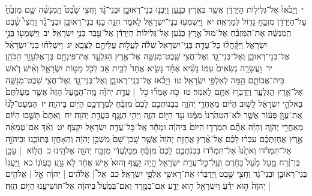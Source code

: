\documentclass[18pt]{article}
\newcommand{\vart}[1]{\Bfootnote{#1}}	%
\begin{document}
 {\loc י~}וַיָּבֹ֙אוּ֙ אֶל־גְּלִיל֣וֹת הַיַּרְדֵּ֔ן אֲשֶׁ֖ר בְּאֶ֣רֶץ כְּנָ֑עַן וַיִּבְנ֣וּ בְנֵי־רְאוּבֵ֣ן וּבְנֵי־גָ֡ד וַחֲצִ֣י שֵׁ֩בֶט֩ הַֽמְנַשֶּׁ֨ה שָׁ֤ם מִזְבֵּ֙חַ֙ עַל־הַיַּרְדֵּ֔ן מִזְבֵּ֥חַ גָּד֖וֹל לְמַרְאֶֽה׃ \startlock
 {\loc יא~}וַיִּשְׁמְע֥וּ בְנֵי־יִשְׂרָאֵ֖ל לֵאמֹ֑ר הִנֵּ֣ה בָנ֣וּ בְנֵי־רְאוּבֵ֣ן וּבְנֵי־גָ֡ד וַחֲצִי֩ שֵׁ֨בֶט הַֽמְנַשֶּׁ֜ה אֶת־הַמִּזְבֵּ֗חַ אֶל־מוּל֙ אֶ֣רֶץ כְּנַ֔עַן אֶל־גְּלִילוֹת֙ הַיַּרְדֵּ֔ן אֶל־עֵ֖בֶר בְּנֵ֥י יִשְׂרָאֵֽל׃ \startlock
 {\loc יב~}וַֽיִּשְׁמְע֖וּ בְּנֵ֣י יִשְׂרָאֵ֑ל וַיִּקָּ֨הֲל֜וּ כׇּל־עֲדַ֤ת בְּנֵֽי־יִשְׂרָאֵל֙ שִׁלֹ֔ה לַעֲל֥וֹת עֲלֵיהֶ֖ם לַצָּבָֽא׃ \startlock
 {\loc יג~}וַיִּשְׁלְח֨וּ בְנֵי־יִשְׂרָאֵ֜ל אֶל־בְּנֵי־רְאוּבֵ֧ן וְאֶל־בְּנֵי־גָ֛ד וְאֶל־חֲצִ֥י שֵֽׁבֶט־מְנַשֶּׁ֖ה אֶל־אֶ֣רֶץ הַגִּלְעָ֑ד אֶת־פִּֽינְחָ֖ס בֶּן־אֶלְעָזָ֥ר הַכֹּהֵֽן׃ \startlock
 {\loc יד~}וַעֲשָׂרָ֤ה נְשִׂאִים֙ עִמּ֔וֹ נָשִׂ֨יא אֶחָ֜ד נָשִׂ֤יא אֶחָד֙ לְבֵ֣ית אָ֔ב לְכֹ֖ל מַטּ֣וֹת יִשְׂרָאֵ֑ל וְאִ֨ישׁ רֹ֧אשׁ בֵּית־אֲבוֹתָ֛ם הֵ֖מָּה לְאַלְפֵ֥י יִשְׂרָאֵֽל׃ \startlock
 {\loc טו~}וַיָּבֹ֜אוּ אֶל־בְּנֵֽי־רְאוּבֵ֧ן וְאֶל־בְּנֵי־גָ֛ד וְאֶל־חֲצִ֥י שֵׁבֶט־מְנַשֶּׁ֖ה אֶל־אֶ֣רֶץ הַגִּלְעָ֑ד וַיְדַבְּר֥וּ אִתָּ֖ם לֵאמֹֽר׃ \startlock
 {\loc טז~}כֹּ֣ה אָמְר֞וּ כֹּ֣ל  |  עֲדַ֣ת יְהֹוָ֗ה מָֽה־הַמַּ֤עַל הַזֶּה֙ אֲשֶׁ֤ר מְעַלְתֶּם֙ בֵּאלֹהֵ֣י יִשְׂרָאֵ֔ל לָשׁ֣וּב הַיּ֔וֹם מֵאַחֲרֵ֖י יְהֹוָ֑ה בִּבְנוֹתְכֶ֤ם לָכֶם֙ מִזְבֵּ֔חַ לִמְרׇדְכֶ֥ם הַיּ֖וֹם בַּיהֹוָֽה׃ \startlock
 {\loc יז~}הַמְעַט־לָ֙נוּ֙ אֶת־עֲוֺ֣ן פְּע֔וֹר אֲשֶׁ֤ר לֹא־הִטַּהַ֙רְנוּ֙ מִמֶּ֔נּוּ עַ֖ד הַיּ֣וֹם הַזֶּ֑ה וַיְהִ֥י הַנֶּ֖גֶף בַּעֲדַ֥ת יְהֹוָֽה׃ \startlock
 {\loc יח~}וְאַתֶּם֙ תָּשֻׁ֣בוּ הַיּ֔וֹם מֵאַחֲרֵ֖י יְהֹוָ֑ה וְהָיָ֗ה אַתֶּ֞ם תִּמְרְד֤וּ הַיּוֹם֙ בַּיהֹוָ֔ה וּמָחָ֕ר אֶֽל־כׇּל־עֲדַ֥ת יִשְׂרָאֵ֖ל יִקְצֹֽף׃ \startlock
 {\loc יט~}וְאַ֨ךְ אִם־טְמֵאָ֜ה אֶ֣רֶץ אֲחֻזַּתְכֶ֗ם עִבְר֨וּ לָכֶ֜ם אֶל־אֶ֨רֶץ אֲחֻזַּ֤ת יְהֹוָה֙ אֲשֶׁ֤ר שָֽׁכַן־שָׁם֙ מִשְׁכַּ֣ן יְהֹוָ֔ה וְהֵאָחֲז֖וּ בְּתוֹכֵ֑נוּ וּבַיהֹוָ֣ה אַל־תִּמְרֹ֗דוּ וְאֹתָ֙נוּ֙ אַל־תִּמְרֹ֔דוּ בִּבְנֹתְכֶ֤ם לָכֶם֙ מִזְבֵּ֔חַ מִֽבַּלְעֲדֵ֔י מִזְבַּ֖ח יְהֹוָ֥ה אֱלֹהֵֽינוּ׃ \startlock
 {\loc כ~}הֲל֣וֹא  |  עָכָ֣ן בֶּן־זֶ֗רַח מָ֤עַל מַ֙עַל֙ בַּחֵ֔רֶם וְעַֽל־כׇּל־עֲדַ֥ת יִשְׂרָאֵ֖ל הָ֣יָה קָ֑צֶף וְהוּא֙ אִ֣ישׁ אֶחָ֔ד לֹ֥א גָוַ֖ע בַּעֲוֺנֽוֹ׃ \startlock
 {\loc כא~}וַֽיַּעֲנוּ֙ בְּנֵי־רְאוּבֵ֣ן וּבְנֵי־גָ֔ד וַחֲצִ֖י שֵׁ֣בֶט  \edtext{הַֽמְנַשֶּׁ֑ה}{\vart{א=הַֽמֲנַשֶּׁ֑ה | }}  וַֽיְדַבְּר֔וּ אֶת־רָאשֵׁ֖י אַלְפֵ֥י יִשְׂרָאֵֽל׃ \startlock
 {\loc כב~}אֵל֩  |  אֱלֹהִ֨ים  |  יְהֹוָ֜ה אֵ֣ל  |  אֱלֹהִ֤ים  |  יְהֹוָה֙ ה֣וּא יֹדֵ֔עַ וְיִשְׂרָאֵ֖ל ה֣וּא יֵדָ֑ע אִם־בְּמֶ֤רֶד וְאִם־בְּמַ֙עַל֙ בַּיהֹוָ֔ה אַל־תּוֹשִׁיעֵ֖נוּ הַיּ֥וֹם הַזֶּֽה׃ \startlock
\end{document}
